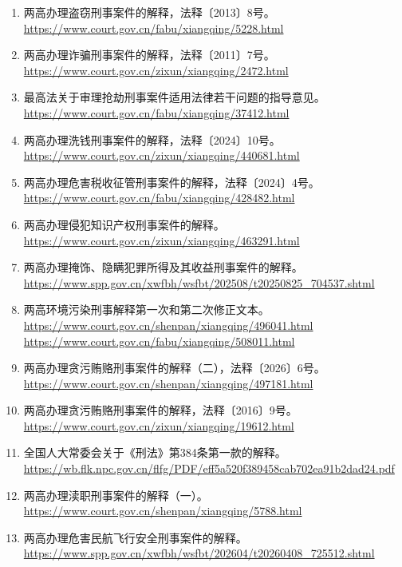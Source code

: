 \begin{enumerate}
 \item 两高办理盗窃刑事案件的解释，法释〔2013〕8号。
 \url{https://www.court.gov.cn/fabu/xiangqing/5228.html}
 \item 两高办理诈骗刑事案件的解释，法释〔2011〕7号。
 \url{https://www.court.gov.cn/zixun/xiangqing/2472.html}
 \item 最高法关于审理抢劫刑事案件适用法律若干问题的指导意见。
 \url{https://www.court.gov.cn/fabu/xiangqing/37412.html}
 \item 两高办理洗钱刑事案件的解释，法释〔2024〕10号。
 \url{https://www.court.gov.cn/zixun/xiangqing/440681.html}
 \item 两高办理危害税收征管刑事案件的解释，法释〔2024〕4号。
 \url{https://www.court.gov.cn/fabu/xiangqing/428482.html}
 \item 两高办理侵犯知识产权刑事案件的解释。
 \url{https://www.court.gov.cn/zixun/xiangqing/463291.html}
 \item 两高办理掩饰、隐瞒犯罪所得及其收益刑事案件的解释。
 \url{https://www.spp.gov.cn/xwfbh/wsfbt/202508/t20250825_704537.shtml}
 \item 两高环境污染刑事解释第一次和第二次修正文本。
 \url{https://www.court.gov.cn/shenpan/xiangqing/496041.html}
 \url{https://www.court.gov.cn/fabu/xiangqing/508011.html}
 \item 两高办理贪污贿赂刑事案件的解释（二），法释〔2026〕6号。
 \url{https://www.court.gov.cn/shenpan/xiangqing/497181.html}
 \item 两高办理贪污贿赂刑事案件的解释，法释〔2016〕9号。
 \url{https://www.court.gov.cn/zixun/xiangqing/19612.html}
 \item 全国人大常委会关于《刑法》第384条第一款的解释。
 \url{https://wb.flk.npc.gov.cn/flfg/PDF/eff5a520f389458cab702ea91b2dad24.pdf}
 \item 两高办理渎职刑事案件的解释（一）。
 \url{https://www.court.gov.cn/shenpan/xiangqing/5788.html}
 \item 两高办理危害民航飞行安全刑事案件的解释。
 \url{https://www.spp.gov.cn/xwfbh/wsfbt/202604/t20260408_725512.shtml}
\end{enumerate}
